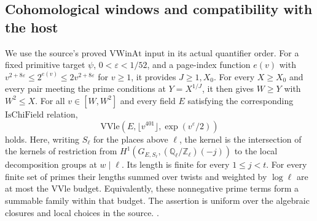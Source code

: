 \subsection{Cohomological windows and compatibility with the host}

We use the source's proved \(\mathrm{VWinAt}\) input in its actual quantifier order. For a fixed primitive target \(\psi\), \(0<\varepsilon<1/52\), and a page-index function \(e(v)\) with \(v^{2+8\varepsilon}\le 2^{e(v)}\le2v^{2+8\varepsilon}\) for \(v\ge1\), it provides \(J\ge1,X_0\). For every \(X\ge X_0\) and every pair meeting the prime conditions at \(Y=X^{1/J}\), it then gives \(W\ge Y\) with \(W^2\le X\). For all \(v\in[W,W^2]\) and every field \(E\) satisfying the corresponding \(\mathrm{IsChiField}\) relation,
\[
 \mathrm{VVle}\!\left(E,\lfloor v^{401}\rfloor,\exp(v^\varepsilon/2)\right)
\]
holds. Here, writing \(S_\ell\) for the places above \(\ell\), the kernel is the intersection of the kernels of restriction from \(H^1(G_{E,S_\ell},(\mathbb Q_\ell/\mathbb Z_\ell)(-j))\) to the local decomposition groups at \(w\mid\ell\). Its length is finite for every \(1\le j<t\). For every finite set of primes their lengths summed over twists and weighted by \(\log\ell\) are at most the \(\mathrm{VVle}\) budget. Equivalently, these nonnegative prime terms form a summable family within that budget. The assertion is uniform over the algebraic closures and local choices in the source. \quad
{}.

